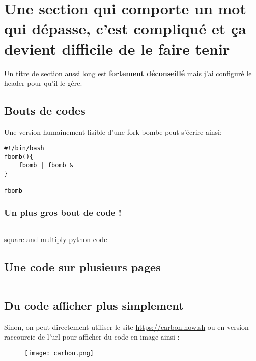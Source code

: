 \section{Une section qui comporte un mot qui dépasse, c'est compliqué et ça devient difficile de le faire tenir}
Un titre de section aussi long est \textbf{fortement déconseillé} mais j'ai configuré le header pour qu'il le gère.

\subsection{Bouts de codes}
Une version humainement lisible d'une fork bombe peut s'écrire ainsi:
\begin{verbatim}
#!/bin/bash
fbomb(){
    fbomb | fbomb &
}

fbomb
\end{verbatim}

\subsubsection{Un plus gros bout de code !}
\begin{listing}[H]
    \inputminted{python}{src/parts/code/example.py}
    \caption{square and multiply python code}
    \label{cd:square_and_mult}
\end{listing}

\subsection{Une code sur plusieurs pages}

\inputminted{python}{src/parts/code/example2.py}


\subsection{Du code afficher plus simplement}

Sinon, on peut directement utiliser le site \url{https://carbon.now.sh} ou en version raccourcie de l'url  pour afficher du code en image ainsi :
\begin{figure}[H]
    \centering
    \texttt{[image: carbon.png]}
\end{figure}

